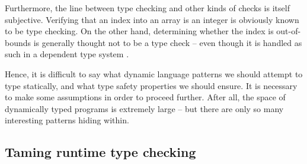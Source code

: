 Furthermore, the line between type checking and other kinds of checks is itself subjective.
Verifying that an index into an array is an integer is obviously known to be type checking.
On the other hand, determining whether the index is out-of-bounds is generally thought not to be a type check -- even though it is handled as such in a dependent type system \cite{dex, futhark-size-dependent}. 

Hence, it is difficult to say what dynamic language patterns we should attempt to type statically, and what type safety properties we should ensure. It is necessary to make some assumptions in order to proceed further.
After all, the space of dynamically typed programs is extremely large -- but there are only so many interesting patterns hiding within.

\needspace{6em}
\subsection{Taming runtime type checking}
\label{subsec:runtime-type-checking}

